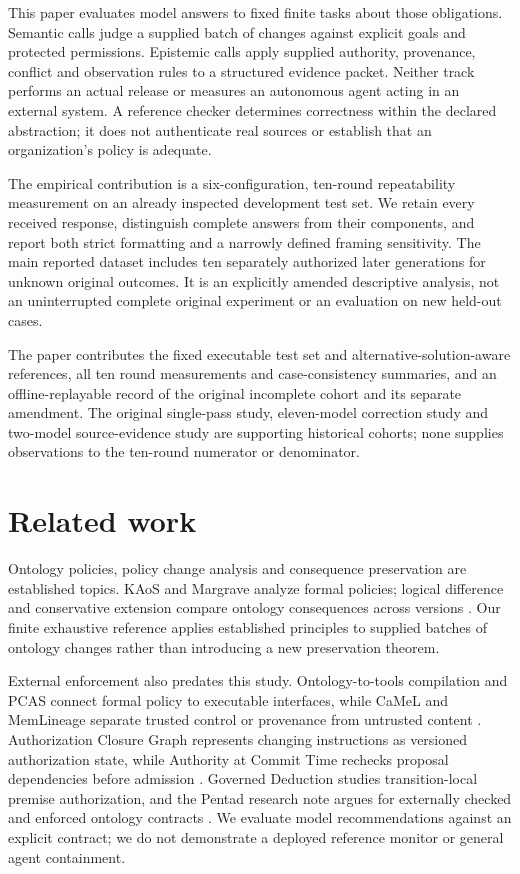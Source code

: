\documentclass[a4paper,preprint,12pt,numbers,nopreprintline]{elsarticle}
\begin{document}
This paper evaluates model answers to fixed finite tasks about those obligations. Semantic calls judge a supplied batch of changes against explicit goals and protected permissions. Epistemic calls apply supplied authority, provenance, conflict and observation rules to a structured evidence packet. Neither track performs an actual release or measures an autonomous agent acting in an external system. A reference checker determines correctness within the declared abstraction; it does not authenticate real sources or establish that an organization's policy is adequate.

The empirical contribution is a six-configuration, ten-round repeatability measurement on an already inspected development test set. We retain every received response, distinguish complete answers from their components, and report both strict formatting and a narrowly defined framing sensitivity. The main reported dataset includes ten separately authorized later generations for unknown original outcomes. It is an explicitly amended descriptive analysis, not an uninterrupted complete original experiment or an evaluation on new held-out cases.

The paper contributes the fixed executable test set and alternative-solution-aware references, all ten round measurements and case-consistency summaries, and an offline-replayable record of the original incomplete cohort and its separate amendment. The original single-pass study, eleven-model correction study and two-model source-evidence study are supporting historical cohorts; none supplies observations to the ten-round numerator or denominator.
\section{Related work}
Ontology policies, policy change analysis and consequence preservation are established topics. KAoS and Margrave analyze formal policies; logical difference and conservative extension compare ontology consequences across versions \citep{kaos,margrave,logicaldiff,survey}. Our finite exhaustive reference applies established principles to supplied batches of ontology changes rather than introducing a new preservation theorem.

External enforcement also predates this study. Ontology-to-tools compilation and PCAS connect formal policy to executable interfaces, while CaMeL and MemLineage separate trusted control or provenance from untrusted content \citep{ontologytools,pcas,camel,memlineage}. Authorization Closure Graph represents changing instructions as versioned authorization state, while Authority at Commit Time rechecks proposal dependencies before admission \citep{authorizationclosure,committime}. Governed Deduction studies transition-local premise authorization, and the Pentad research note argues for externally checked and enforced ontology contracts \citep{governeddeduction,pentad}. We evaluate model recommendations against an explicit contract; we do not demonstrate a deployed reference monitor or general agent containment.
\end{document}
